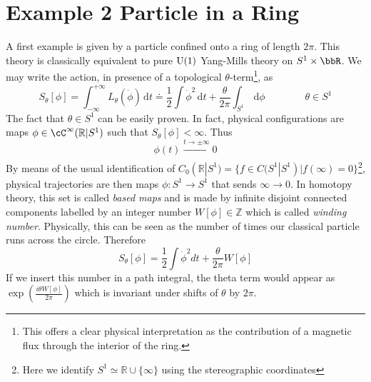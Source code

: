  
\section{Example 2 Particle in a Ring}
A first example is given by a particle confined onto a ring of length $2\pi$. This theory is classically equivalent to pure $\mathrm{U}(1)$ Yang-Mills theory on $S^{1}\times\bbR$. We may write the action, in presence of a topological $\theta$-term\footnote{This offers a clear physical interpretation as the contribution of a magnetic flux through the interior of the ring.}, as
\begin{equation}
    S_\theta[\phi]= \int_{-\infty}^{+\infty} L_{\theta}(\Dot{\phi})\, \mathrm dt \doteq \frac{1}{2}\int \dot \phi^2\, \mathrm dt + \frac{\theta}{2\pi}\int_{S^1}\, \mathrm d\phi\qquad\qquad \theta\in S^1
\end{equation}
The fact that $\theta\in S^{1}$ can be easily proven. In fact, physical configurations are maps $\phi \in \cC^{\infty}(\mathbb{R}| S^1)$ such that $S_{\theta}[\phi]< \infty$. Thus
\begin{equation}
    \phi(t) \xrightarrow[]{t \to \pm \infty} 0
\end{equation}
By means of the usual identification of ${C}_0(\mathbb{R}|S^1) =\{f \in {C}(S^1| S^1) | f(\infty)=0\}$\footnote{Here we identify $S^1 \simeq \mathbb{R} \cup \{\infty\}$ using the stereographic coordinates}, physical trajectories are then maps $\phi: S^1 \to S^1$ that sends $\infty \to 0$. In homotopy theory, this set is called \textit{based maps} and is made by infinite disjoint connected components labelled by an integer number $ W[\phi] \in \mathbb{Z}$ which is called \textit{winding number}. Physically, this can be seen as the number of times our classical particle runs across the circle. Therefore
\begin{equation}
    S_{\theta}[\phi] = \frac{1}{2} \int \Dot{\phi}^2 dt + \frac{\theta}{2 \pi} W[\phi]
\end{equation}
If we insert this number in a path integral, the theta term would appear as $\exp(\frac{i \theta W[\phi]}{2\pi})$ which is invariant under shifts of $\theta$ by $2 \pi$.

